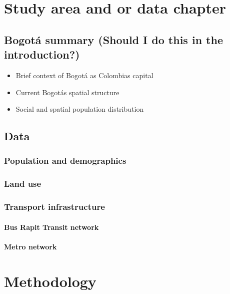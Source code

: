 \documentclass[12pt, a4paper]{report}
\begin{document}
\chapter{Study area and or data chapter} \label{Chap3}

\section{Bogot\'{a} summary (Should I do this in the introduction?)}

\begin{itemize}
  \item Brief context of Bogot\'{a} as Colombia\textquotesingle s capital
  \item Current Bogot\'{a}\textquotesingle s spatial structure
  \item Social and spatial population distribution
\end{itemize}

\section{Data}

\subsection{Population and demographics}

\subsection{Land use}

\subsection{Transport infrastructure}

\subsubsection{Bus Rapit Transit network}

\subsubsection{Metro network}



\chapter{Methodology} \label{Chap4}
\end{document}

